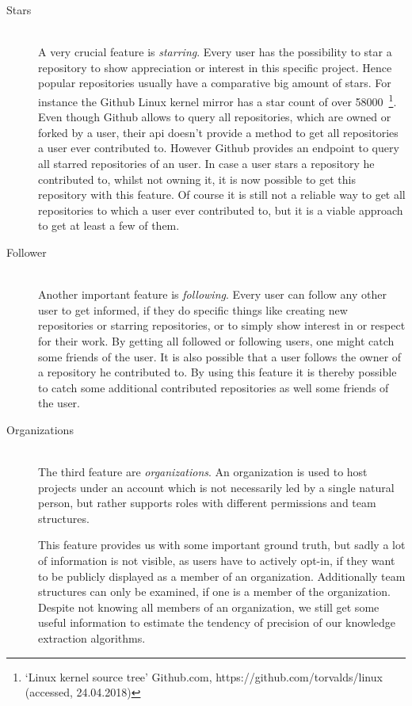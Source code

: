 \begin{description}
    \item[Stars] \hfill \\
        A very crucial feature is \emph{starring}. Every user has the possibility to star a repository to show appreciation or interest in this specific project.
        Hence popular repositories usually have a comparative big amount of stars. For instance the Github Linux kernel mirror has a star count of over 58000~\footnote{`Linux kernel source tree' Github.com, https://github.com/torvalds/linux (accessed, 24.04.2018)}.
        Even though Github allows to query all repositories, which are owned or forked by a user, their \ac{api} doesn't provide a method to get all repositories a user ever contributed to.
        However Github provides an endpoint to query all starred repositories of an user.
        In case a user stars a repository he contributed to, whilst not owning it, it is now possible to get this repository with this feature.
        Of course it is still not a reliable way to get all repositories to which a user ever contributed to, but it is a viable approach to get at least a few of them.

    \item[Follower] \hfill \\
        Another important feature is \emph{following}.
        Every user can follow any other user to get informed, if they do specific things like creating new repositories or starring repositories, or to simply show interest in or respect for their work.
        By getting all followed or following users, one might catch some friends of the user.
        It is also possible that a user follows the owner of a repository he contributed to.
        By using this feature it is thereby possible to catch some additional contributed repositories as well some friends of the user.

    \item[Organizations] \hfill \\
        The third feature are \emph{organizations}.
        An organization is used to host projects under an account which is not necessarily led by a single natural person, but rather supports roles with different permissions and team structures.

        This feature provides us with some important ground truth, but sadly a lot of information is not visible, as users have to actively opt-in, if they want to be publicly displayed as a member of an organization.
        Additionally team structures can only be examined, if one is a member of the organization.
        Despite not knowing all members of an organization, we still get some useful information to estimate the tendency of precision of our knowledge extraction algorithms.
\end{description}
